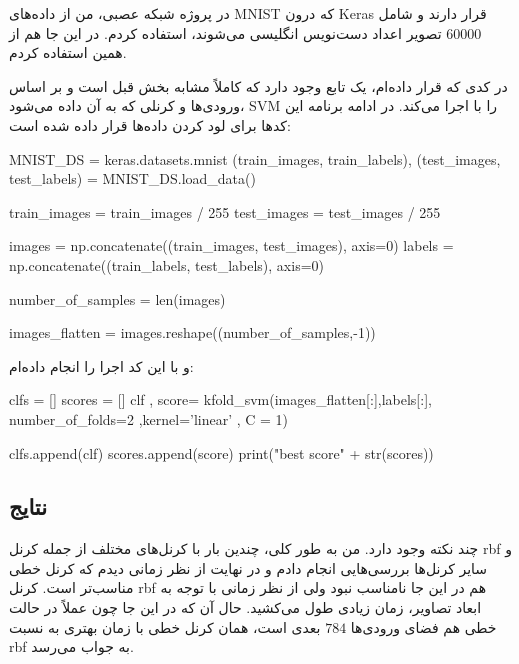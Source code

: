 \documentclass[12pt,titlepage,a4page , tikz , multi,table , svgnames,xcdraw]{article}
\begin{document}
در پروژه شبکه عصبی، من از داده‌های MNIST که درون Keras قرار دارند و شامل 60000 تصویر اعداد دست‌نویس انگلیسی می‌شوند، استفاده کردم. در این جا هم از همین استفاده کردم.

در کدی که قرار داده‌ام، یک تابع  وجود دارد که کاملاً مشابه بخش قبل است و بر اساس ورودی‌ها و کرنلی که به آن داده می‌شود، SVM را با  اجرا می‌کند. در ادامه برنامه این کدها برای لود کردن داده‌ها قرار داده شده است:



\begin{latin}
\begin{python}[language=Python]
MNIST_DS = keras.datasets.mnist
(train_images, train_labels), (test_images, test_labels) =
 MNIST_DS.load_data()

train_images = train_images / 255
test_images = test_images / 255


images = np.concatenate((train_images, test_images), axis=0)
labels = np.concatenate((train_labels, test_labels), axis=0)

number_of_samples = len(images)

images_flatten = images.reshape((number_of_samples,-1))
\end{python}

\end{latin}

و با این کد اجرا را انجام داده‌ام:


\begin{latin}
\begin{python}[language=Python]
clfs = []
scores = []
clf , score= kfold_svm(images_flatten[:],labels[:],
number_of_folds=2 ,kernel='linear' , C = 1)

clfs.append(clf)
scores.append(score)
print("best score" + str(scores))
\end{python}

\end{latin}


\subsection{نتایج}

چند نکته وجود دارد. من به طور کلی، چندین بار با کرنل‌های مختلف از جمله کرنل rbf و سایر کرنل‌ها بررسی‌هایی انجام دادم و در نهایت از نظر زمانی دیدم که کرنل خطی مناسب‌تر است. کرنل rbf هم در این جا نامناسب نبود ولی از نظر زمانی با توجه به ابعاد تصاویر، زمان زیادی طول می‌کشید. حال آن که در این جا چون عملاً در حالت خطی هم فضای ورودی‌ها $784$ بعدی است، همان کرنل خطی با زمان بهتری به نسبت rbf به جواب می‌رسد.
\end{document}
